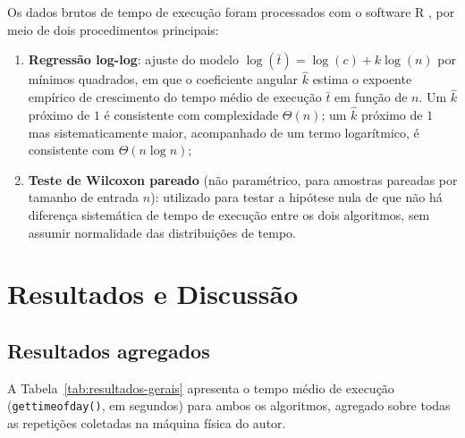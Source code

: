 \documentclass[
	12pt,
	oneside,
	a4paper,
	chapter=TITLE,
	section=TITLE,
	subsection=TITLE,
	subsubsection=TITLE,
	english,
	brazil
]{abntex2}
\theoremstyle{plain}
\theoremstyle{remark}
\renewcommand{\_}{\underscoreoriginal\allowbreak}
\begin{document}
Os dados brutos de tempo de execução foram processados com o software R \cite{rcoreteam}, por meio de dois procedimentos principais:

\begin{enumerate}
	\item \textbf{Regressão log-log}: ajuste do modelo $\log(\bar{t}) = \log(c) + k \log(n)$ por mínimos quadrados, em que o coeficiente angular $\hat{k}$ estima o expoente empírico de crescimento do tempo médio de execução $\bar{t}$ em função de $n$. Um $\hat{k}$ próximo de $1$ é consistente com complexidade $\Theta(n)$; um $\hat{k}$ próximo de $1$ mas sistematicamente maior, acompanhado de um termo logarítmico, é consistente com $\Theta(n \log n)$;
	\item \textbf{Teste de Wilcoxon pareado} (não paramétrico, para amostras pareadas por tamanho de entrada $n$): utilizado para testar a hipótese nula de que não há diferença sistemática de tempo de execução entre os dois algoritmos, sem assumir normalidade das distribuições de tempo.
\end{enumerate}

\chapter{Resultados e Discussão}
\label{cap:resultados}

\section{Resultados agregados}

A Tabela~\ref{tab:resultados-gerais} apresenta o tempo médio de execução (\texttt{gettimeofday()}, em segundos) para ambos os algoritmos, agregado sobre todas as repetições coletadas na máquina física do autor.
\end{document}
